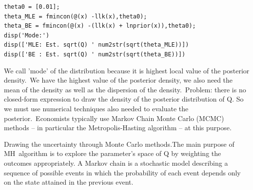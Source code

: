\documentclass[a4paper,12pt]{article}%
\begin{document}
\vspace{1ex}
\begin{verbatim}
theta0 = [0.01];
theta_MLE = fmincon(@(x) -llk(x),theta0);
theta_BE = fmincon(@(x) -(llk(x) + lnprior(x)),theta0);
disp('Mode:')
disp(['MLE: Est. sqrt(Q) ' num2str(sqrt(theta_MLE))])
disp(['BE : Est. sqrt(Q) ' num2str(sqrt(theta_BE))])
\end{verbatim}
\vspace{1ex}%


We call 'mode' of the distribution because it is highest local value of the
posterior density.\ We have the highest value of the posterior density, we
also need the mean of the density as well as the dispersion of the
density.\ Problem: there is no closed-form expression to draw the density of
the posterior distribution of Q. So we must use numerical techniques also
needed to evaluate the posterior.\ Economists typically use Markov Chain Monte
Carlo (MCMC) methods -- in particular the Metropolis-Hasting algorithm -- at
this purpose.

\textsf{Drawing the uncertainty through Monte Carlo methods}.The main purpose
of MH\ algorithm is to explore the parameter's space of Q by weighting the
outcomes appropriately. A Markov chain is a stochastic model describing a
sequence of possible events in which the probability of each event depends
only on the state attained in the previous event.
\end{document}
